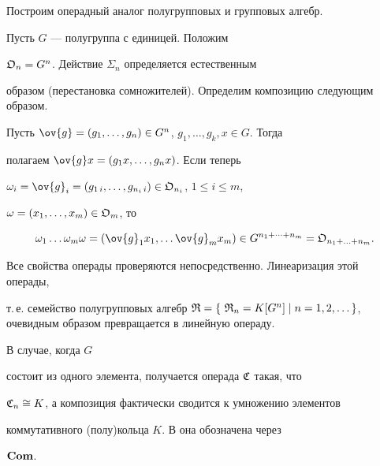 \begin{exam}


Построим операдный аналог полугрупповых и групповых алгебр.


Пусть $G$ --- полугруппа с единицей. Положим


$\frak O_n=G^n$. Действие $\Sigma_n$ определяется естественным


образом (перестановка сомножителей). Определим композицию следующим образом.


Пусть $\ov{g}=(g_1,\dotsc, g_n)\in G^n$, $g_1,\dotsc,g_k,x\in G$. Тогда


полагаем $ \ov{g}x=(g_1 x,\dotsc, g_n x)$. Если теперь


$\omega_i=\ov{g}_i=(g_{1\,i}, \dotsc, g_{n_i\,i})\in


\frak O_{n_i}$, $1\le i \le m$,


$\omega=(x_1,\dotsc, x_m)\in \frak O_m$, то


$$


\omega_1\dotsc \omega_m\omega=(\ov{g}_1 x_1,\dotsc\ov{g}_m x_m)\in


G^{n_1+\dotsb +n_m}=


\frak O_{n_1+\dotsc +n_m}.


$$


Все свойства операды проверяются непосредственно. Линеаризация этой операды,


т.\,е. семейство полугрупповых алгебр $\frak R=\{ \ \frak R_n= K[G^n]\mid


n=1,2,\dotsc\}$, очевидным образом превращается в линейную операду.


В случае, когда $G$


состоит из одного элемента, получается операда $\frak C$ такая, что


$\frak C_n\cong K$, а композиция фактически сводится к умножению элементов


коммутативного (полу)кольца $K$. В \cite{GK} она обозначена через


$\bold{Com}$.


\end{exam}





